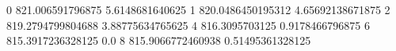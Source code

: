 0 821.006591796875 5.6148681640625
1 820.0486450195312 4.65692138671875
2 819.2794799804688 3.88775634765625
4 816.3095703125 0.9178466796875
6 815.3917236328125 0.0
8 815.9066772460938 0.51495361328125
